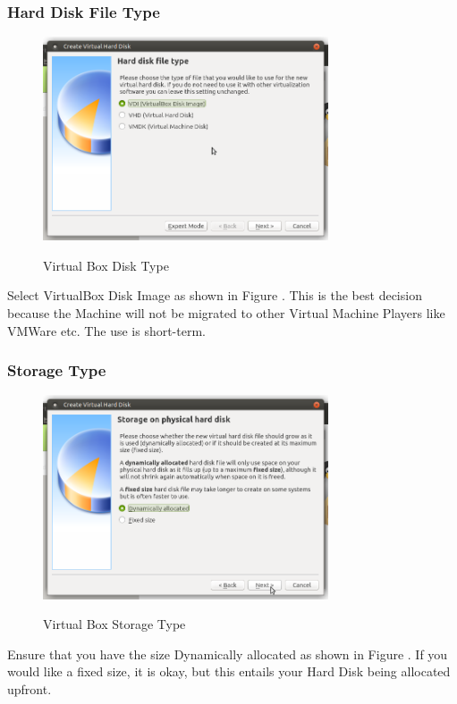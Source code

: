 \subsubsection{Hard Disk File Type}
\begin{figure}[!htb]
    \centering
    \includegraphics[width=0.752\textwidth]{images/00-03.png}\\[0cm]  
    \caption[Virtual Box]{Virtual Box Disk Type}
    \label{fig:00-04 - Windows Virtual Box Disk Type} 
\end{figure}
Select VirtualBox Disk Image as shown in Figure .
This is the best decision because the Machine will not be migrated to other
Virtual Machine Players like VMWare etc. The use is short-term.

\subsubsection{Storage Type}
\begin{figure}[!htb]
    \centering
    \includegraphics[width=0.752\textwidth]{images/00-04.png}\\[0cm]  
    \caption[Virtual Box]{Virtual Box Storage Type}
    \label{fig:00-05 - Windows Virtual Box Storage Type} 
\end{figure}
Ensure that you have the size Dynamically allocated as shown in Figure .
If you would like a fixed size, it is okay, but this entails your Hard Disk
being allocated upfront.

